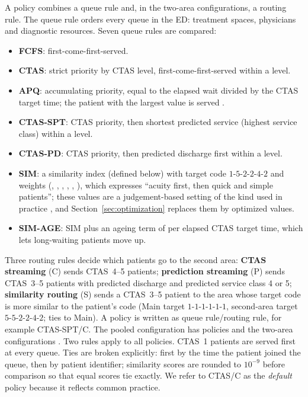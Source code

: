 A policy combines a queue rule and, in the two-area configurations, a routing rule. The queue rule orders every queue in the ED: treatment spaces, physicians and diagnostic resources. Seven queue rules are compared:
\begin{itemize}
\item \textbf{FCFS}: first-come-first-served.
\item \textbf{CTAS}: strict priority by CTAS level, first-come-first-served within a level.
\item \textbf{APQ}: accumulating priority, equal to the elapsed wait divided by the CTAS target time; the patient with the largest value is served \cite{StanfordTaylorZiedins2014_APQ}.
\item \textbf{CTAS-SPT}: CTAS priority, then shortest predicted service (highest service class) within a level.
\item \textbf{CTAS-PD}: CTAS priority, then predicted discharge first within a level.
\item \textbf{SIM}: a similarity index (defined below) with target code $1$-$5$-$2$-$2$-$4$-$2$ and weights (\SimWA, \SimWB, \SimWC, \SimWD, \SimWE, \SimWF), which expresses ``acuity first, then quick and simple patients''; these values are a judgement-based setting of the kind used in practice \cite{GT-in-ED_HCMS2016}, and Section~\ref{sec:optimization} replaces them by optimized values.
\item \textbf{SIM-AGE}: SIM plus an ageing term of \SimAging{} per elapsed CTAS target time, which lets long-waiting patients move up.
\end{itemize}
Three routing rules decide which patients go to the second area: \textbf{CTAS streaming} (C) sends CTAS~4--5 patients; \textbf{prediction streaming} (P) sends CTAS~3--5 patients with predicted discharge and predicted service class 4 or 5; \textbf{similarity routing} (S) sends a CTAS~3--5 patient to the area whose target code is more similar to the patient's code (Main target $1$-$1$-$1$-$1$-$1$-$1$, second-area target $5$-$5$-$2$-$2$-$4$-$2$; ties to Main). A policy is written as queue rule/routing rule, for example CTAS-SPT/C. The pooled configuration has \NQueueRules{} policies and the two-area configurations \NPoliciesTwoArea. Two rules apply to all policies. CTAS~1 patients are served first at every queue. Ties are broken explicitly: first by the time the patient joined the queue, then by patient identifier; similarity scores are rounded to $10^{-9}$ before comparison so that equal scores tie exactly. We refer to CTAS/C as the \emph{default} policy because it reflects common practice.

